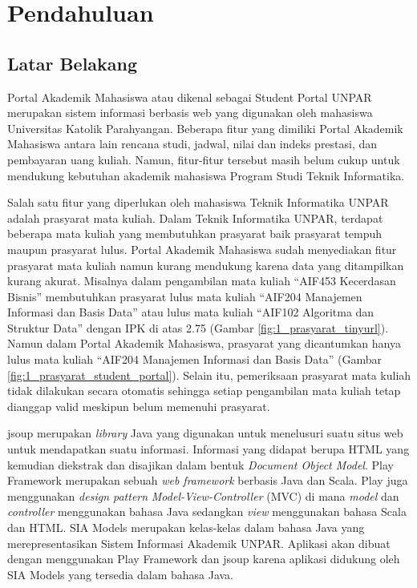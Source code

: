 \chapter{Pendahuluan}
\label{chap:pendahuluan}

\section{Latar Belakang}
\label{sec:latar_belakang}

Portal Akademik Mahasiswa atau dikenal sebagai Student Portal UNPAR\cite{studentportalunpar} merupakan sistem informasi berbasis web yang digunakan oleh mahasiswa Universitas Katolik Parahyangan. Beberapa fitur yang dimiliki Portal Akademik Mahasiswa antara lain rencana studi, jadwal, nilai dan indeks prestasi, dan pembayaran uang kuliah. Namun, fitur-fitur tersebut masih belum cukup untuk mendukung kebutuhan akademik mahasiswa Program Studi Teknik Informatika. 

Salah satu fitur yang diperlukan oleh mahasiswa Teknik Informatika UNPAR adalah prasyarat mata kuliah. Dalam Teknik Informatika UNPAR, terdapat beberapa mata kuliah yang membutuhkan prasyarat baik prasyarat tempuh maupun prasyarat lulus. Portal Akademik Mahasiswa sudah menyediakan fitur prasyarat mata kuliah namun kurang mendukung karena data yang ditampilkan kurang akurat. Misalnya dalam pengambilan mata kuliah ``AIF453 Kecerdasan Bisnis'' membutuhkan prasyarat lulus mata kuliah ``AIF204 Manajemen Informasi dan Basis Data'' atau lulus mata kuliah ``AIF102 Algoritma dan Struktur Data'' dengan IPK di atas 2.75 (Gambar \ref{fig:1_prasyarat_tinyurl}). Namun dalam Portal Akademik Mahasiswa, prasyarat yang dicantumkan hanya lulus mata kuliah ``AIF204 Manajemen Informasi dan Basis Data'' (Gambar \ref{fig:1_prasyarat_student_portal}). Selain itu, pemeriksaan prasyarat mata kuliah tidak dilakukan secara otomatis sehingga setiap pengambilan mata kuliah tetap dianggap valid meskipun belum memenuhi prasyarat.

jsoup\cite{jsoup} merupakan \textit{library} Java yang digunakan untuk menelusuri suatu situs web untuk mendapatkan suatu informasi. Informasi yang didapat berupa HTML yang kemudian diekstrak dan disajikan dalam bentuk \textit{Document Object Model}. Play Framework\cite{Leroux:2014} merupakan sebuah \textit{web framework} berbasis Java dan Scala. Play juga menggunakan \textit{design pattern} \textit{Model-View-Controller} (MVC) di mana \textit{model} dan \textit{controller} menggunakan bahasa Java sedangkan \textit{view} menggunakan bahasa Scala dan HTML. SIA Models\cite{siamodels} merupakan kelas-kelas dalam bahasa Java yang merepresentasikan Sistem Informasi Akademik UNPAR. Aplikasi akan dibuat dengan menggunakan Play Framework dan jsoup karena aplikasi didukung oleh SIA Models yang tersedia dalam bahasa Java. 

